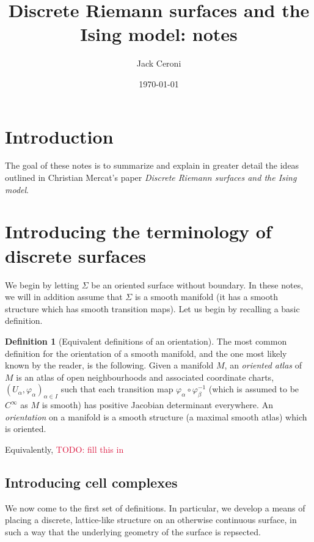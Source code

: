 \documentclass[aps,pra,showpacs,notitlepage,onecolumn,superscriptaddress,nofootinbib]{revtex4-1}
\newcommand{\pop}[1]{\textcolor{crimson}{#1}}
\theoremstyle{definition}
\newtheorem{definition}{Definition}[section]
\begin{document}
\title{Discrete Riemann surfaces and the Ising model: notes}
\author{Jack Ceroni}

\date{\today}

\maketitle

\section{Introduction}

\noindent The goal of these notes is to summarize and explain in greater detail the ideas outlined in Christian Mercat's paper \emph{Discrete Riemann surfaces and the Ising model}.

\section{Introducing the terminology of discrete surfaces}

\noindent We begin by letting $\Sigma$ be an oriented surface without boundary. In these notes, we will in addition assume that $\Sigma$ is a smooth manifold (it has a smooth structure which
has smooth transition maps). Let us begin by recalling a basic definition.

\begin{definition}[Equivalent definitions of an orientation]
  The most common definition for the orientation of a smooth manifold, and the one most likely known by the reader, is the following.
  Given a manifold $M$, an \emph{oriented atlas} of $M$ is an atlas of open neighbourhoods and associated coordinate charts, $(U_{\alpha}, \varphi_{\alpha})_{\alpha \in I}$
  such that each transition map $\varphi_{\alpha} \circ \varphi_{\beta}^{-1}$ (which is assumed to be $C^{\infty}$ as $M$ is smooth) has positive Jacobian determinant everywhere.
  An \emph{orientation} on a manifold is a smooth structure (a maximal smooth atlas) which is oriented.

  Equivalently, \pop{TODO: fill this in}
\end{definition}

\subsection{Introducing cell complexes}

\noindent We now come to the first set of definitions. In particular, we develop a means of placing a discrete, lattice-like structure on an otherwise continuous surface,
in such a way that the underlying geometry of the surface is repsected.
\end{document}

